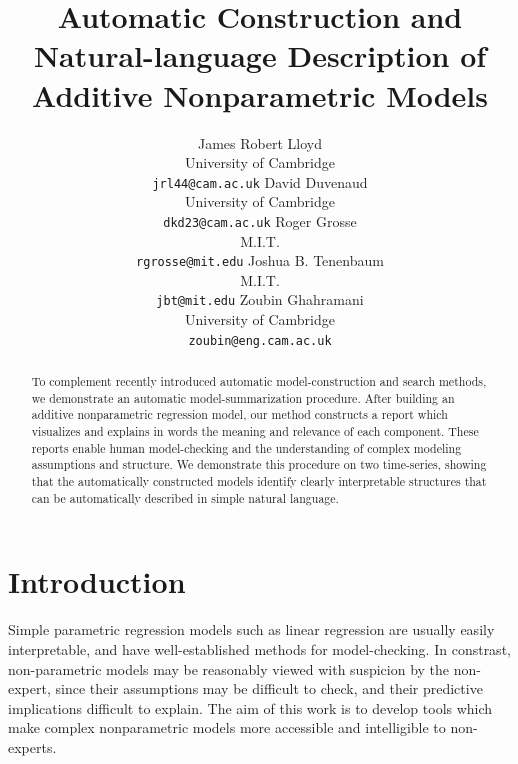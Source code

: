 \documentclass{article} %
\title{Automatic Construction and Natural-language Description of Additive Nonparametric Models}
\author{
James Robert Lloyd\\
University of Cambridge\\
\texttt{jrl44@cam.ac.uk}
\And
David Duvenaud\\
University of Cambridge \\
\texttt{dkd23@cam.ac.uk}
\And
Roger Grosse\\
M.I.T.\\
\texttt{rgrosse@mit.edu}
\And
Joshua B. Tenenbaum\\
M.I.T.\\
\texttt{jbt@mit.edu}
\And
Zoubin Ghahramani\\
University of Cambridge \\
\texttt{zoubin@eng.cam.ac.uk}
}
\begin{document}
\allowdisplaybreaks

\maketitle

\begin{abstract}
To complement recently introduced automatic model-construction and search methods, we demonstrate an automatic model-summarization procedure.
After building an additive nonparametric regression model, our method constructs a report which visualizes and explains in words the meaning and relevance of each component.
These reports enable human model-checking and the understanding of complex modeling assumptions and structure.
We demonstrate this procedure on two time-series, showing that the automatically constructed models identify clearly interpretable structures that can be automatically described in simple natural language.
\end{abstract}

\section{Introduction}
\vspace{-0.08in}


Simple parametric regression models such as linear regression are usually easily interpretable, and have well-established methods for model-checking.
In constrast, non-parametric models may be reasonably viewed with suspicion by the non-expert, since their assumptions may be difficult to check, and their predictive implications difficult to explain.
The aim of this work is to develop tools which make complex nonparametric models more accessible and intelligible to non-experts.

\end{document}

